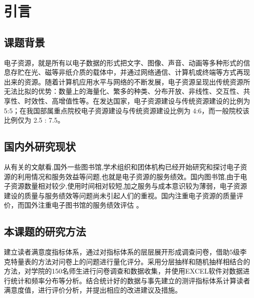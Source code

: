 \section{引言}
    \subsection{课题背景}
        电子资源，就是所有以电子数据的形式把文字、图像、声音、动画等多种形式的信息存贮在光、磁等非纸介质的载体中，并通过网络通信、计算机或终端等方式再现出来的资源。随着计算机应用水平与网络的不断发展，电子资源呈现出传统资源所无法比拟的优势：数量上的海量化、繁多的种类、分布开放、非线性、交互性、共享性、时效性、高增值性等。在发达国家，电子资源建设与传统资源建设的比例为 5:5；在我国部属重点院校电子资源建设与传统资源建设比例为 4:6，而一般院校该比例仅为 2.5 : 7.5。
    \subsection{国内外研究现状}
        从有关的文献看,国外一些图书馆,学术组织和团体机构已经开始研究和探讨电子资源的利用情况和服务效益等问题,也就是电子资源的服务绩效。国内图书馆,由于电子资源数量相对较少,使用时间相对较短,加之服务与成本意识较为薄弱，电子资源建设的质量与服务绩效等问题尚未引起人们的重视。国内注重电子资源的质量评价，而国外注重电子图书馆的服务绩效评估 。
    \subsection{本课题的研究方法}
        建立读者满意度指标体系，通过对指标体系的层层展开形成调查问卷，借助5级李克特量表的方法对问卷上的问题进行量化评分。采用分层抽样和随机抽样相结合的方法，对学院的150名师生进行问卷调查和数据收集，并使用EXCEL软件对数据进行统计和频率分布等分析。结合统计好的数据与事先建立的测评指标体系计算读者满意度值，进行评价分析，并提出相应的改进建议及措施。